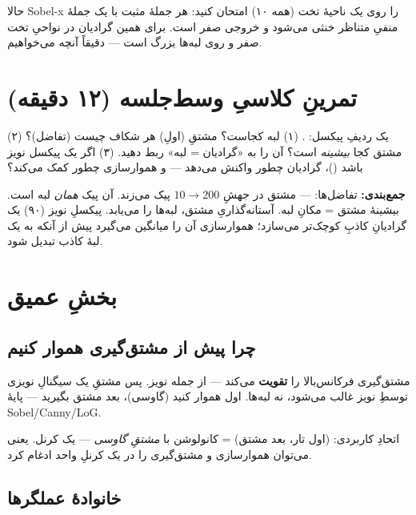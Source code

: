 \documentclass[12pt,a4paper]{article}
\begin{document}
\begin{nokte}
حالا Sobel-x را روی یک ناحیهٔ تخت (همه ۱۰) امتحان کنید: هر جملهٔ مثبت با یک جملهٔ منفیِ متناظر
خنثی می‌شود و خروجی صفر است. برای همین گرادیان در نواحیِ تخت صفر و روی لبه‌ها بزرگ است — دقیقاً
آنچه می‌خواهیم.
\end{nokte}

\section{تمرینِ کلاسیِ وسط‌جلسه (۱۲ دقیقه)}

\begin{tamrin}
یک ردیفِ پیکسل: \lr{[10, 10, 10, 200, 200, 200]}. (۱) لبه کجاست؟ مشتقِ (اولِ) هر شکاف چیست
(تفاضل)؟ (۲) مشتق کجا \emph{بیشینه} است؟ آن را به «گرادیان = لبه» ربط دهید. (۳) اگر یک پیکسل نویز
باشد (\lr{[10,10,90,200,200,200]})، گرادیان چطور واکنش می‌دهد — و هموارسازی چطور کمک می‌کند؟
\end{tamrin}

\textbf{جمع‌بندی:} تفاضل‌ها: \lr{[0,0,190,0,0]} — مشتق در جهشِ $10\rightarrow200$ پیک می‌زند. آن
پیک \emph{همان} لبه است. بیشینهٔ مشتق = مکانِ لبه. آستانه‌گذاریِ مشتق، لبه‌ها را می‌یابد. پیکسلِ
نویز (۹۰) یک گرادیانِ کاذبِ کوچک‌تر می‌سازد؛ هموارسازی آن را میانگین می‌گیرد پیش از آنکه به یک لبهٔ
کاذب تبدیل شود.

\section{بخشِ عمیق}

\subsection{چرا پیش از مشتق‌گیری هموار کنیم}

مشتق‌گیری فرکانس‌بالا را \textbf{تقویت} می‌کند — از جمله نویز. پس مشتقِ یک سیگنالِ نویزی توسطِ نویز
غالب می‌شود، نه لبه‌ها. اول هموار کنید (گاوسی)، بعد مشتق بگیرید — پایهٔ Sobel/Canny/LoG.

\begin{riyazi}
اتحادِ کاربردی: (اول تار، بعد مشتق) = کانولوشن با \emph{مشتقِ گاوسی} — یک کرنل. یعنی می‌توان
هموارسازی و مشتق‌گیری را در یک کرنلِ واحد ادغام کرد.
\end{riyazi}

\subsection{خانوادهٔ عملگرها}
\end{document}
